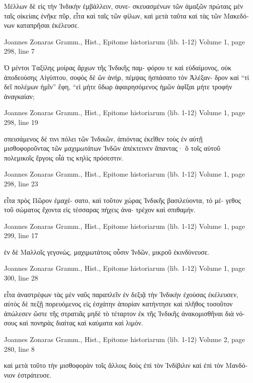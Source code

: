 \documentclass[12pt,letterpaper,twoside,final]{memoir}
\begin{document}
\begin{greek}
Μέλλων δὲ εἰς τὴν Ἰνδικὴν ἐμβάλλειν, συνε-
σκευασμένων τῶν ἁμαξῶν πρώταις μὲν ταῖς οἰκείαις 
ἐνῆκε πῦρ, εἶτα καὶ ταῖς τῶν φίλων, καὶ μετὰ ταῦτα 
καὶ τὰς τῶν Μακεδόνων καταπρῆσαι ἐκέλευσε. 



Joannes Zonaras Gramm., Hist., Epitome historiarum (lib. 1-12) 
Volume 1, page 298, line 7

Ὁ μέντοι Ταξίλης μοίρας ἄρχων τῆς Ἰνδικῆς παμ-
φόρου τε καὶ εὐδαίμονος, οὐκ ἀποδεούσης Αἰγύπτου, 
σοφὸς δὲ ὢν ἀνήρ, πέμψας ἠσπάσατο τὸν Ἀλέξαν-
δρον καί “τί δεῖ πολέμων ἡμῖν” ἔφη, “εἰ μήτε ὕδωρ 
ἀφαιρησόμενος ἡμῶν ἀφῖξαι μήτε τροφὴν ἀναγκαίαν; 



Joannes Zonaras Gramm., Hist., Epitome historiarum (lib. 1-12) 
Volume 1, page 298, line 19

                                          σπεισάμενος 
δέ τινι πόλει τῶν Ἰνδικῶν, ἀπιόντας ἐκεῖθεν τοὺς 
ἐν αὐτῇ μισθοφοροῦντας τῶν μαχιμωτάτων Ἰνδῶν 
ἀπέκτεινεν ἅπαντας· ὃ τοῖς αὐτοῦ πολεμικοῖς ἔργοις 
οἷά τις κηλὶς πρόσεστιν. 



Joannes Zonaras Gramm., Hist., Epitome historiarum (lib. 1-12) 
Volume 1, page 298, line 23

                              εἶτα πρὸς Πῶρον ἐμαχέ-
σατο, καὶ τοῦτον χώρας Ἰνδικῆς βασιλεύοντα, τὸ μέ-
γεθος τοῦ σώματος ἔχοντα εἰς τέσσαρας πήχεις ἀνα-
τρέχον καὶ σπιθαμήν. 



Joannes Zonaras Gramm., Hist., Epitome historiarum (lib. 1-12) 
Volume 1, page 299, line 17

                                ἐν δὲ Μαλλοῖς γεγονώς, 
μαχιμωτάτοις οὖσιν Ἰνδῶν, μικροῦ ἐκινδύνευσε. 



Joannes Zonaras Gramm., Hist., Epitome historiarum (lib. 1-12) 
Volume 1, page 300, line 28

            εἶτα ἀναστρέφων τὰς μὲν ναῦς παραπλεῖν 
ἐν δεξιᾷ τὴν Ἰνδικὴν ἐχούσας ἐκέλευσεν, αὐτὸς δὲ 
πεζῇ πορευόμενος εἰς ἐσχάτην ἀπορίαν κατήντησε καὶ   
πλῆθος τοσοῦτον ἀπώλεσεν ὥστε τῆς στρατιᾶς μηδὲ 
τὸ τέταρτον ἐκ τῆς Ἰνδικῆς ἀνακομισθῆναι διὰ νό-
σους καὶ πονηρὰς διαίτας καὶ καύματα καὶ λιμόν. 



Joannes Zonaras Gramm., Hist., Epitome historiarum (lib. 1-12) 
Volume 2, page 280, line 8

                                        καὶ μετὰ τοῦτο 
τὴν μισθοφορὰν τοῖς ἄλλοις δοὺς ἐπὶ τὸν Ἰνδίβιλιν 
καὶ ἐπὶ τὸν Μανδόνιον ἐστράτευσε. 




\end{greek}
\end{document}
